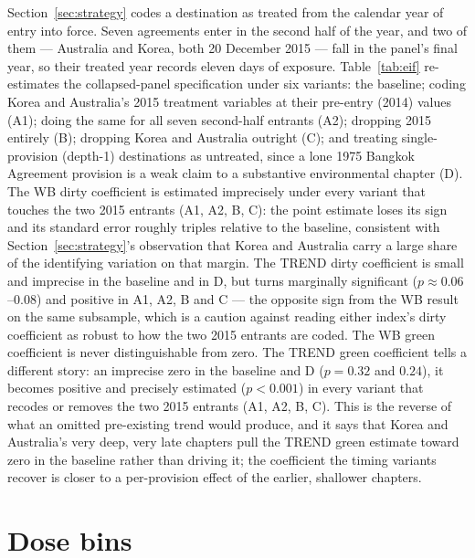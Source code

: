\documentclass[12pt]{article}
\begin{document}
Section~\ref{sec:strategy} codes a destination as treated from the calendar year of entry into
force. Seven agreements enter in the second half of the year, and two of them --- Australia and
Korea, both 20 December 2015 --- fall in the panel's final year, so their treated year records
eleven days of exposure. Table~\ref{tab:eif} re-estimates the collapsed-panel specification under
six variants: the baseline; coding Korea and Australia's 2015 treatment variables at their
pre-entry (2014) values (A1); doing the same for all seven second-half entrants (A2); dropping
2015 entirely (B); dropping Korea and Australia outright (C); and treating single-provision
(depth-1) destinations as untreated, since a lone 1975 Bangkok Agreement provision is a weak claim
to a substantive environmental chapter (D). The WB dirty coefficient is estimated imprecisely
under every variant that touches the two 2015 entrants (A1, A2, B, C): the point estimate loses its
sign and its standard error roughly triples relative to the baseline, consistent with
Section~\ref{sec:strategy}'s observation that Korea and Australia carry a large share of the
identifying variation on that margin. The TREND dirty coefficient is small and imprecise in the
baseline and in D, but turns marginally significant ($p \approx 0.06$--$0.08$) and positive in
A1, A2, B and C --- the opposite sign from the WB result on the same subsample, which is a caution
against reading either index's dirty coefficient as robust to how the two 2015 entrants are coded.
The WB green coefficient is never distinguishable from zero. The TREND green coefficient tells a
different story: an imprecise zero in the baseline and D ($p = 0.32$ and $0.24$), it becomes
positive and precisely estimated ($p < 0.001$) in every variant that recodes or removes the two
2015 entrants (A1, A2, B, C). This is the reverse of what an omitted pre-existing trend would
produce, and it says that Korea and Australia's very deep, very late chapters pull the TREND green
estimate toward zero in the baseline rather than driving it; the coefficient the timing variants
recover is closer to a per-provision effect of the earlier, shallower chapters.



\section{Dose bins}\label{app:dose}
\end{document}
